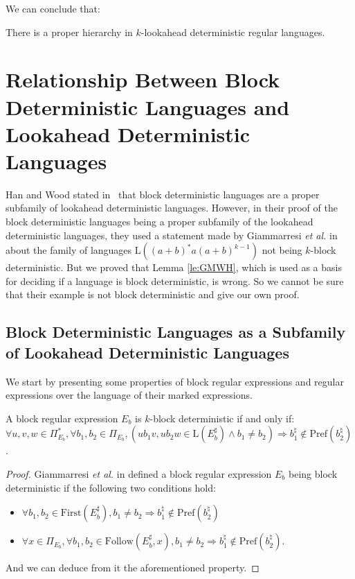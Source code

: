 \documentclass{llncs}
\begin{document}
	We can conclude that:
\begin{theorem}
	There is a proper hierarchy in $k$-lookahead deterministic regular languages.
\end{theorem}


\section{Relationship Between Block Deterministic Languages and Lookahead Deterministic Languages}\label{se:inclusion_kbd_kld}

	Han and Wood stated in~\cite{HW08} that block deterministic languages are a proper subfamily of lookahead deterministic languages.
	However, in their proof of the block deterministic languages being a proper subfamily of the lookahead deterministic languages, they used a statement made by Giammarresi \emph{et al.} in~\cite{GMW01} about the family of languages $\mathrm{L}((a+b)^*a(a+b)^{k-1})$ not being $k$-block deterministic.
	But we proved that Lemma \ref{le:GMWH}, which is used as a basis for deciding if a language is block deterministic, is wrong.
	So we cannot be sure that their example is not block deterministic and give our own proof.

\subsection{Block Deterministic Languages as a Subfamily of Lookahead Deterministic Languages}

	We start by presenting some properties of block regular expressions and regular expressions over the language of their marked expressions.
	

\begin{lemma}
	A block regular expression $E_b$ is $k$-block deterministic if and only if: 
	$\forall u,v,w \in \Pi_{E_b}^*, \forall b_1,b_2 \in \Pi_{E_b}, (ub_1v, ub_2w \in \mathrm{L}(E_b^{\sharp}) \wedge b_1 \neq b_2) \Longrightarrow b_1^{\natural} \notin \mathrm{Pref}(b_2^{\natural})$.
\end{lemma}
\begin{proof}
	Giammarresi \emph{et al.} in \cite{GMW01} defined a block regular expression $E_b$ being block deterministic if the following two conditions hold:
	\begin{itemize}
		\item $\forall b_1, b_2 \in \mathrm{First}(E_b^{\sharp}), b_1 \neq b_2 \Longrightarrow b_1^{\natural} \notin \mathrm{Pref}(b_2^{\natural})$
		\item $\forall x \in \Pi_{E_b}, \forall b_1, b_2 \in \mathrm{Follow}(E_b^{\sharp}, x), b_1 \neq b_2 \Longrightarrow b_1^{\natural} \notin \mathrm{Pref}(b_2^{\natural})$.
	\end{itemize}
	And we can deduce from it the aforementioned property.
\end{proof}
\end{document}
